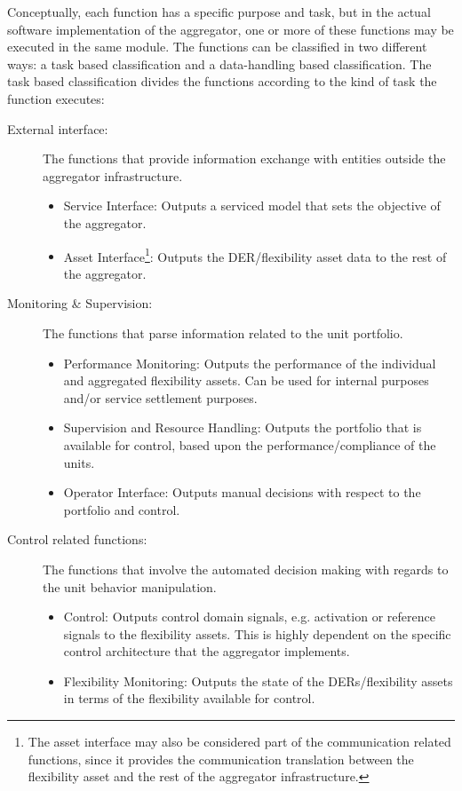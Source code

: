 Conceptually, each function has a specific purpose and task, but in the actual software implementation of the aggregator, one or more of these functions may be executed in the same module. The functions can be classified in two different ways: a task based classification and a data-handling based classification. The task based classification divides the functions according to the kind of task the function executes:
\begin{description}
	\item[External interface:] The functions that provide information exchange with entities outside the aggregator infrastructure.
		\begin{itemize}
			\item Service Interface: Outputs a serviced model that sets the objective of the aggregator.
			\item Asset Interface\footnote{The asset interface may also be considered part of the communication related functions, since it provides the communication translation between the flexibility asset and the rest of the aggregator infrastructure.}: Outputs the DER/flexibility asset data to the rest of the aggregator.
		\end{itemize}
	\item[Monitoring \& Supervision:] The functions that parse information related to the unit portfolio.
		\begin{itemize}
			\item Performance Monitoring: Outputs the performance of the individual and aggregated flexibility assets. Can be used for internal purposes and/or service settlement purposes.
			\item Supervision and Resource Handling: Outputs the portfolio that is available for control, based upon the performance/compliance of the units.
			\item Operator Interface: Outputs manual decisions with respect to the portfolio and control.
		\end{itemize}
	\item[Control related functions:] The functions that involve the automated decision making with regards to the unit behavior manipulation.
		\begin{itemize}
			\item Control: Outputs control domain signals, e.g. activation or reference signals to the flexibility assets. This is highly dependent on the specific control architecture that the aggregator implements.
			\item Flexibility Monitoring: Outputs the state of the DERs/flexibility assets in terms of the flexibility available for control.

\end{itemize}
\end{description}

